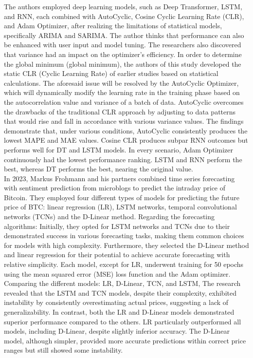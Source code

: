 \documentclass{ieeeojies}
\begin{document}
\vspace{0.3cm}
\par The authors \cite{huong} employed deep learning models, such as Deep Transformer, LSTM, and RNN, each combined with AutoCyclic, Cosine Cyclic Learning Rate (CLR), and Adam Optimizer, after realizing the limitations of statistical models, specifically ARIMA and SARIMA. The author thinks that performance can also be enhanced with user input and model tuning. The researchers also discovered that variance had an impact on the optimizer's efficiency.
In order to determine the global minimum (global minimum), the authors of this study developed the static CLR (Cyclic Learning Rate) of earlier studies based on statistical calculations.
The aforesaid issue will be resolved by the AutoCyclic Optimizer, which will dynamically modify the learning rate in the training phase based on the autocorrelation value and variance of a batch of data. AutoCyclic overcomes the drawbacks of the traditional CLR approach by adjusting to data patterns that would rise and fall in accordance with various variance values.
The findings demonstrate that, under various conditions, AutoCyclic consistently produces the lowest MAPE and MAE values. Cosine CLR produces subpar RNN outcomes but performs well for DT and LSTM models. In every scenario, Adam Optimizer continuously had the lowest performance ranking. LSTM and RNN perform the best, whereas DT performs the best, nearing the original value.\\
In 2023, Markus Frohmann and his partners \cite{hang} combined time series forecasting with sentiment prediction from microblogs to predict the intraday price of Bitcoin. They employed four different types of models for predicting the future price of BTC: linear regression (LR), LSTM networks, temporal convolutional networks (TCNs) and the D-Linear method.
Regarding the forecasting algorithms: Initially, they opted for LSTM networks and TCNs due to their demonstrated success in various forecasting tasks, making them common choices for models with high complexity. Furthermore, they selected the D-Linear method and linear regression for their potential to achieve accurate forecasting with relative simplicity. Each model, except for LR, underwent training for 50 epochs using the mean squared error (MSE) loss function and the Adam optimizer.
Comparing the different models: LR, D-Linear, TCN, and LSTM, The research revealed that the LSTM and TCN models, despite their complexity, exhibited instability by consistently overestimating actual prices, suggesting a lack of generalizability. In contrast, both the LR and D-Linear models demonstrated superior performance compared to the others. LR particularly outperformed all models, including D-Linear, despite slightly inferior accuracy. The D-Linear model, although simpler, provided more accurate predictions within correct price ranges but still showed some instability.\\
\end{document}
